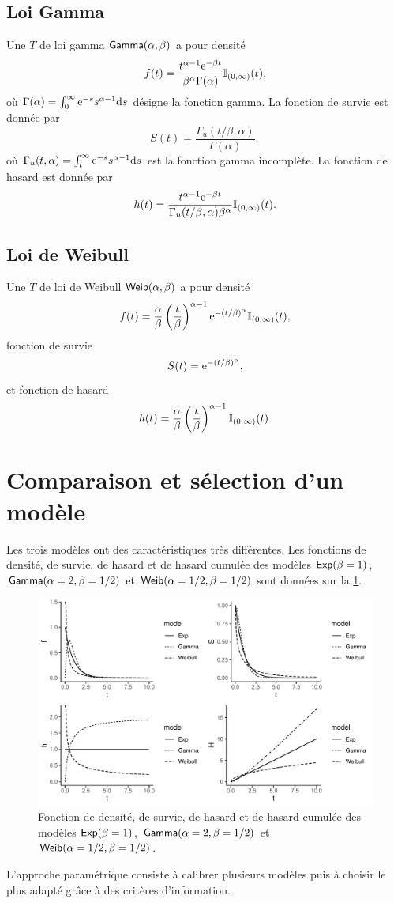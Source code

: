 \subsection{Loi Gamma}\label{ssec:gamma}
Une \va $T$ de loi gamma $\mathsf{Gamma}(\alpha, \beta)$ a pour densité
$$
f(t) = \frac{t^{\alpha-1}\mathrm{e}^{-\beta t}}{\beta^\alpha\Gamma(\alpha)}\mathbb{I}_{(0,\infty)}(t),
$$ 
où $\Gamma(\alpha) = \int_0^\infty \mathrm{e}^{-s}s^{\alpha-1}\text{d}s$ désigne la fonction gamma. La fonction de survie est donnée par
$$
S(t) = \frac{\Gamma_u(t/\beta, \alpha)}{\Gamma(\alpha)},
$$
où $\Gamma_u(t, \alpha) =\int_t^\infty\mathrm{e}^{-s}s^{\alpha-1}\text{d}s $ est la fonction gamma incomplète. La fonction de hasard est donnée par
$$
h(t) = \frac{t^{\alpha-1}\mathrm{e}^{-\beta t}}{\Gamma_u(t/\beta, \alpha)\beta^\alpha}\mathbb{I}_{(0,\infty)}(t).
$$
\subsection{Loi de Weibull}\label{ssec:weibull}
Une \va $T$ de loi de Weibull $\mathsf{Weib}(\alpha, \beta)$ a pour densité
$$
f(t) = \frac{\alpha}{\beta}\left(\frac{t}{\beta}\right)^{\alpha-1}\mathrm{e}^{-(t/\beta)^\alpha}\mathbb{I}_{(0,\infty)}(t),
$$ 
fonction de survie
$$
S(t) = \mathrm{e}^{-(t/\beta)^\alpha},
$$
et fonction de hasard
$$
h(t) = \frac{\alpha}{\beta}\left(\frac{t}{\beta}\right)^{\alpha-1}\mathbb{I}_{(0,\infty)}(t).
$$
\section{Comparaison et sélection d'un modèle}
Les trois modèles ont des caractéristiques très différentes. Les fonctions de densité, de survie, de hasard et de hasard cumulée des modèles $\mathsf{Exp}(\beta = 1)$, $\mathsf{Gamma}(\alpha = 2, \beta = 1/2)$ et $\mathsf{Weib}(\alpha = 1 / 2, \beta = 1/2)$ sont données sur la \cref{fig:d_S_h_H_parametric}.
\begin{figure}[h!]
\centering
\includegraphics[width = \textwidth]{../figures/d_S_h_H_parametric}
\caption{Fonction de densité, de survie, de hasard et de hasard cumulée des modèles $\mathsf{Exp}(\beta = 1)$, $\mathsf{Gamma}(\alpha = 2, \beta = 1/2)$ et $\mathsf{Weib}(\alpha = 1 / 2, \beta = 1/2)$.}
\label{fig:d_S_h_H_parametric}
\end{figure}
L'approche paramétrique consiste à calibrer plusieurs modèles puis à choisir le plus adapté grâce à des critères d'information.
